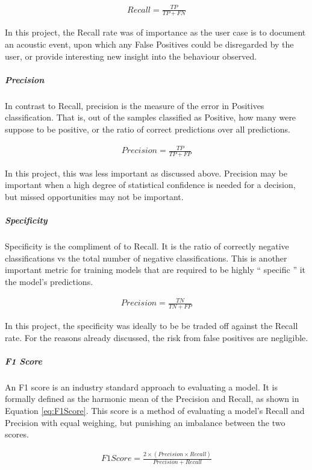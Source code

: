 \documentclass{UoNMCHA}
\newcommand{\inlineQuote}[1]{`` #1 ''}
\newcommand{\eref}[1] {Equation \ref{#1}}
\numberwithin{equation}{section}
\begin{document}
\begin{gather}\label{eq:Recall}
    Recall = \frac{TP}{TP+FN}
\end{gather}

In this project, the Recall rate was of importance as the user case is to document an acoustic event, upon which any False Positives could be disregarded by the user, or provide interesting new insight into the behaviour observed.

\subparagraph{Precision}
In contrast to Recall, precision is the measure of the error in Positives classification. That is, out of the samples classified  as Positive, how many were suppose to be positive, or the ratio of correct predictions over all predictions.

\begin{gather}\label{eq:Precision}
    Precision = \frac{TP}{TP+FP}
\end{gather}

In this project, this was less important as discussed above. Precision may be important when a high degree of statistical confidence is needed for a decision, but missed opportunities may not be important. 

\subparagraph{Specificity}
Specificity is the compliment of to Recall. It is the ratio of correctly negative classifications vs the total number of negative classifications. This is another important metric for training models that are required to be highly \inlineQuote{specific} it the model's predictions.

\begin{gather}\label{eq:Specificity}
    Precision = \frac{TN}{TN+FP}
\end{gather}

In this project, the specificity was ideally to be be traded off against the Recall rate. For the reasons already discussed, the risk from false positives are negligible. 

\subparagraph{F1 Score}
An F1 score is an industry standard approach to evaluating a model. It is formally defined as the harmonic mean of the Precision and Recall, as shown in \eref{eq:F1Score}. This score is a method of evaluating a model's Recall and Precision with equal weighing, but punishing an imbalance between the two scores. 

\begin{gather}\label{eq:F1Score}
    F1 Score = \frac{2 \times (Precision \times Recall)}{Precision + Recall}
\end{gather}
\end{document}
